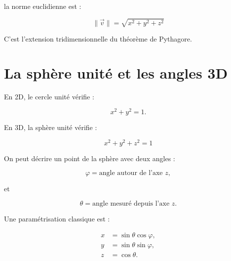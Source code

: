 \documentclass[11pt,a4paper]{article}
\newcommand{\sectiontitle}[1]{\section{#1}}
\begin{document}
la norme euclidienne est :

\[
\boxed{
\|\vec v\|
=
\sqrt{x^2+y^2+z^2}
}
\]

C'est l'extension tridimensionnelle du théorème de Pythagore.


\newpage

\sectiontitle{La sphère unité et les angles 3D}

En 2D, le cercle unité vérifie :

\[
x^2+y^2=1.
\]

En 3D, la sphère unité vérifie :

\[
\boxed{x^2+y^2+z^2=1}
\]

On peut décrire un point de la sphère avec deux angles :

\[
\varphi=\text{angle autour de l'axe }z,
\]

et

\[
\theta=\text{angle mesuré depuis l'axe }z.
\]

Une paramétrisation classique est :

\[
\boxed{
\begin{aligned}
x&=\sin\theta\cos\varphi,\\
y&=\sin\theta\sin\varphi,\\
z&=\cos\theta.
\end{aligned}}
\]
\end{document}

